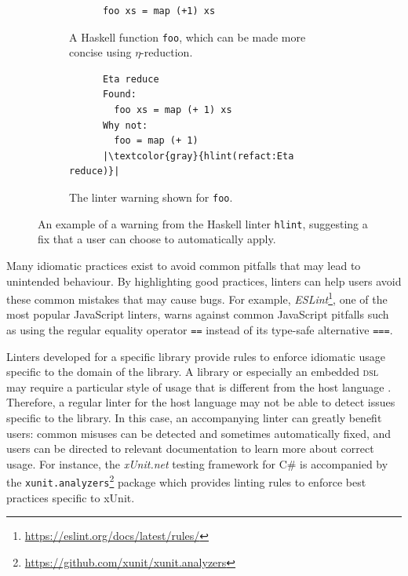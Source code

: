 \begin{figure}[htbp]
  \vspace{3ex} %
  \centering
  \begin{subfigure}{0.45\textwidth}
    \centering
    \begin{verbatim}
      foo xs = map (+1) xs
    \end{verbatim}
    \caption{A Haskell function \texttt{foo}, which can be made more concise using $\eta$-reduction.}
  \end{subfigure}
  \hfill
  \begin{subfigure}{0.45\textwidth}
    \centering
    \begin{verbatim}
      Eta reduce
      Found:
        foo xs = map (+ 1) xs
      Why not:
        foo = map (+ 1)
      |\textcolor{gray}{hlint(refact:Eta reduce)}|
    \end{verbatim}
    \caption{The linter warning shown for \texttt{foo}.}
  \end{subfigure}
  \caption{An example of a warning from the Haskell linter \texttt{hlint}, suggesting a fix that a user can choose to automatically apply.}
  \label{fig:hlint-example}
\end{figure}

Many idiomatic practices exist to avoid common pitfalls that may lead to unintended behaviour.
By highlighting good practices, linters can help users avoid these common mistakes that may cause bugs.
For example, \textit{ESLint}\footnote{\url{https://eslint.org/docs/latest/rules/}}, one of the most popular JavaScript linters, warns against common JavaScript pitfalls such as using the regular equality operator \texttt{==} instead of its type-safe alternative \texttt{===}.

Linters developed for a specific library provide rules to enforce idiomatic usage specific to the domain of the library.
A library or especially an embedded \textsc{dsl} may require a particular style of usage that is different from the host language \cite{hora_domain_2012}.
Therefore, a regular linter for the host language may not be able to detect issues specific to the library.
In this case, an accompanying linter can greatly benefit users: common misuses can be detected and sometimes automatically fixed, and users can be directed to relevant documentation to learn more about correct usage.
For instance, the \textit{xUnit.net} testing framework for C\# is accompanied by the \texttt{xunit.analyzers}\footnote{\url{https://github.com/xunit/xunit.analyzers}} package which provides linting rules to enforce best practices specific to xUnit.

